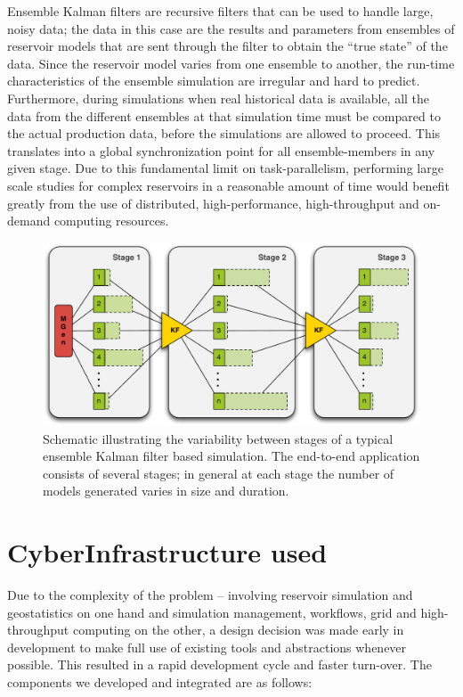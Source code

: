 \documentclass[10pt,conference,final]{IEEEtran}
\begin{document}
Ensemble Kalman filters are recursive filters that can be used to handle large, noisy data; the data in this case are the results and parameters from ensembles of reservoir models that are sent through the filter to obtain the ``true state'' of the data. Since the reservoir model varies from one ensemble to another, the run-time characteristics of the ensemble simulation are irregular and hard to predict. Furthermore, during simulations when real historical data is available, all the data from the different ensembles at that simulation time must be compared to the actual production data, before the simulations are allowed to proceed. This translates into a global synchronization point for all ensemble-members in any given stage. Due to this fundamental limit on task-parallelism, performing large scale studies for complex reservoirs in a reasonable amount of time would benefit greatly from the use of distributed, high-performance, high-throughput and on-demand computing resources.

\begin{figure}
\begin{center}
\includegraphics*[scale=0.33,angle=0]{figures/3StageKalmanFilter}
\end{center}
\caption{Schematic illustrating the variability between stages of a typical
  ensemble Kalman filter based simulation. The end-to-end
  application consists of several stages; in general at each stage the
  number of models generated varies in size and duration.}
\label{fig:irregular_execution}
\end{figure}

\section*{CyberInfrastructure used}

Due to the complexity of the problem -- involving reservoir simulation and geostatistics on one hand and simulation management, workflows, grid and high-throughput computing on the other, a design decision was made early in development to make full use of existing tools and abstractions whenever possible. This resulted in a rapid development cycle and faster turn-over. The components we developed and integrated are as follows:
\end{document}
